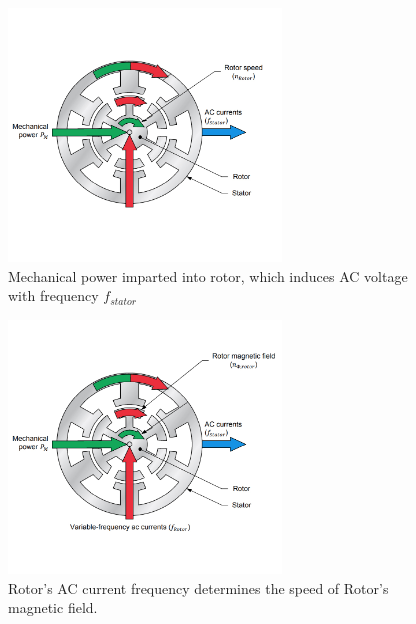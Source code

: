 \documentclass{beamer}
\begin{document}
\begin{frame}{}
    \begin{figure}
        \centering
        \includegraphics[width=2.85in]{imgs/dfigOP (2).jpg}
        \caption{Mechanical power imparted into rotor, which induces AC voltage with frequency $f_{stator}$}
    \end{figure}
\end{frame}

\begin{frame}{}
    \begin{figure}
        \centering
        \includegraphics[width=2.85in]{imgs/dfigOP (3).jpg}
        \caption{Rotor's AC current frequency determines the speed of Rotor's magnetic field.}
    \end{figure}
\end{frame}
\end{document}

